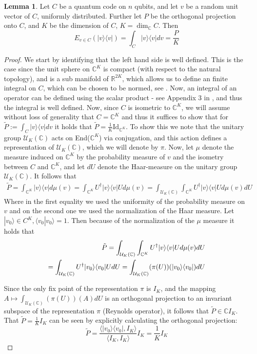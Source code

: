 \documentclass[12pt,a4paper,BCOR15mm,twoside,DIV12]{article}
\def\R{\mathbb{R}}
\def\C{\mathbb{C}}
\def\U{\mathcal{U}}
\def\Id{\text{Id}}
\theoremstyle{definition}
\newtheorem{lem}[Satz]{Lemma}
\begin{document}
\begin{lem}\label{expvalproj}
Let $C$ be a quantum code on $n$ qubits, and let $v$ be a random unit vector of $C$, uniformly distributed. Further let $P$ be the orthogonal projection onto $C$, and $K$ be the dimension of $C$, $K = \dim_\C C$.
Then \begin{equation} E_{v \in C}(|v\rangle \langle v |) = \int_C |v \rangle \langle v | dv = \frac{P}{K} \end{equation}
\begin{proof}
 We start by identifying that the left hand side is well defined. This is the case since the unit sphere on $\C^K$ is compact (with respect to the natural topology), and is a sub manifold of $\R^{2K}$, 
 which allows us to define an finite integral on $C$, which can be chosen to be normed, see \cite{foerster}. Now, an integral of an operator can be defined using the scalar product - see Appendix 3 in \cite{harmana}, and thus the integral is well defined.
 Now, since $C$ is isometric to $\C^K$, we will assume without loss of generality that $C = \C^K$ and thus it suffices to show that for $\tilde P := \int_C |v \rangle \langle v | dv$ it holds that $\tilde P = \frac{1}{K} \Id_{\C^K}$.
To show this we note that the unitary group $\U_K(\C)$ acts on End($\C^K$) via conjugation, and this action defines a representation of $\U_K(\C)$, which we will denote by $\pi$. Now, let $\mu$ denote the measure induced on $\C^K$ by the probability measure of $v$ and the isometry
between $C$ and $\C^K$, and let $dU$ denote the Haar-measure on the unitary group $\U_K(\C)$. It follows that
\begin{align}
\tilde P = \int_{\C^K} |v \rangle \langle v | d \mu(v) = \int_{\C^K} U^\dagger |v \rangle \langle v | U d \mu(v) = \int_{\U_K(\C)} \int_{\C^K} U^\dagger |v \rangle \langle v | U d \mu(v) dU
\end{align}
Where in the first equality we used the uniformity of the probability measure on $v$ and on the second one we used the normalization of the Haar measure. Let $ |v_0 \rangle \in C^K, \langle v_0 | v_0 \rangle = 1$. Then because of the normalization of the $\mu$ measure it holds that
\begin{align}
\tilde P = \int_{\U_K(\C)} \int_{\C^K} U^\dagger |v \rangle \langle v | U d \mu(v) dU \notag \\ = \int_{\U_K(\C)} U^\dagger |v_0 \rangle \langle v_0 | U dU =  \int_{\U_K(\C)} (\pi(U))( |v_0 \rangle \langle v_0 | ) dU
\end{align}

Since the only fix point of the representation $\pi$ is $I_K$, and the mapping $A \mapsto \int_{\U_K(\C)} (\pi(U))(A) dU$ is an orthogonal projection to an invariant subspace of the representation $\pi$ (Reynolds operator), it follows that
$\tilde P \in \C I_K$. That $\tilde P = \frac{1}{K} I_K$ can be seen by explicitly calculating the orthogonal projection: \[ \tilde P = \frac{\langle |v_0 \rangle \langle v_0 |, I_K \rangle}{ \langle I_K, I_K \rangle} I_K = \frac{1}{K} I_K \]
\end{proof}
\end{lem}
\end{document}
